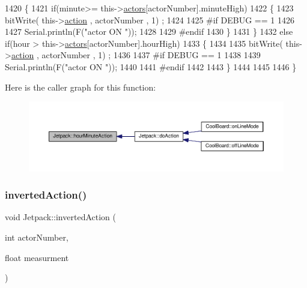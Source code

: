 \begin{DoxyCode}
1420     \{
1421         \textcolor{keywordflow}{if}(minute>= this->\hyperlink{class_jetpack_a7e16d2f97837f9712a2e6de1c50d99db}{actors}[actorNumber].minuteHigh)
1422         \{
1423             bitWrite( this->\hyperlink{class_jetpack_aca3142925a7b0834b34ae91d26af7765}{action} , actorNumber , 1) ;
1424 
1425 \textcolor{preprocessor}{        #if DEBUG == 1 }
1426 
1427             Serial.println(F(\textcolor{stringliteral}{"actor ON "}));
1428 
1429 \textcolor{preprocessor}{        #endif  }
1430         \}
1431     \}
1432     \textcolor{keywordflow}{else} \textcolor{keywordflow}{if}(hour > this->\hyperlink{class_jetpack_a7e16d2f97837f9712a2e6de1c50d99db}{actors}[actorNumber].hourHigh)
1433     \{
1434 
1435         bitWrite( this->\hyperlink{class_jetpack_aca3142925a7b0834b34ae91d26af7765}{action} , actorNumber , 1) ;
1436 
1437 \textcolor{preprocessor}{    #if DEBUG == 1 }
1438 
1439         Serial.println(F(\textcolor{stringliteral}{"actor ON "}));
1440 
1441 \textcolor{preprocessor}{    #endif      }
1442 
1443     \}
1444 
1445     
1446 \}
\end{DoxyCode}
Here is the caller graph for this function\+:
\nopagebreak
\begin{figure}[H]
\begin{center}
\leavevmode
\includegraphics[width=350pt]{df/d1d/class_jetpack_ae01c13c785ebdf1b0bb5500234aba1bd_icgraph}
\end{center}
\end{figure}
\mbox{\label{class_jetpack_adacfc35fab4a621357caf98ce1c9cb54}} 
\subsubsection{\texorpdfstring{inverted\+Action()}{invertedAction()}}
{\footnotesize\ttfamily void Jetpack\+::inverted\+Action (\begin{DoxyParamCaption}\item[{int}]{actor\+Number,  }\item[{float}]{measurment }\end{DoxyParamCaption})}

